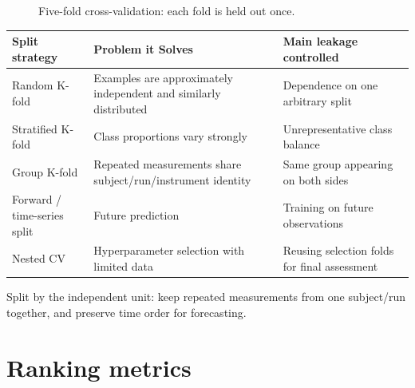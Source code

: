 \begin{figure}[htbp]
    \centering
    \caption{Five-fold cross-validation: each fold is held out once.}
\end{figure}
    
\begin{tabularx}{\linewidth}{@{}L{.24\linewidth}YY@{}}
    \toprule
    Split strategy & Problem it Solves & Main leakage controlled \\
    \midrule
    Random K-fold & Examples are approximately independent and similarly distributed & Dependence on one arbitrary split \\
    Stratified K-fold & Class proportions vary strongly & Unrepresentative class balance \\
    Group K-fold & Repeated measurements share subject/run/instrument identity & Same group appearing on both sides \\
    Forward / time-series split & Future prediction & Training on future observations \\
    Nested CV & Hyperparameter selection with limited data & Reusing selection folds for final assessment \\
    \bottomrule
\end{tabularx}

\begin{calloutpractical}
Split by the independent unit: keep repeated measurements from one subject/run together, and preserve time order for forecasting.
\end{calloutpractical}


\section{Ranking metrics}
\label{sec:evaluation-retrieval-and-ranking-metrics}

